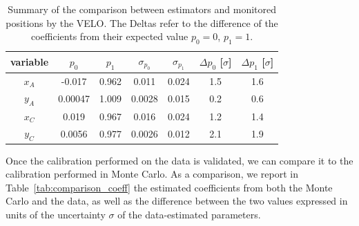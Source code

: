 \begin{table}
    \centering
    \begin{tabular}{c|c|c|c|c|c|c}
    variable  & $p_0$ & $p_1$ & $\sigma_{p_0}$ & $\sigma_{p_1}$ & $\Delta p_0$ [$\sigma$] & $\Delta p_1$ [$\sigma$]\\
    \hline
       $x_A$  & -0.017 & 0.962 & 0.011 & 0.024 & 1.5 & 1.6\\
       $y_A$  & 0.00047 & 1.009 & 0.0028 & 0.015 & 0.2 & 0.6 \\
       $x_C$ & 0.019 & 0.967 & 0.016 & 0.024 & 1.2 & 1.4\\
       $y_C$ & 0.0056 & 0.977 & 0.0026 & 0.012 & 2.1 & 1.9
    \end{tabular}
    \caption{Summary of the comparison between estimators and monitored positions by the VELO. The Deltas refer to the difference of the coefficients from their expected value $p_0=0$, $p_1=1$.}
    \label{tab:summary_velo}
\end{table}

Once the calibration performed on the data is validated, we can compare it to the calibration performed in Monte Carlo. As a comparison, we report in Table~\ref{tab:comparison_coeff} the estimated coefficients from both the Monte Carlo and the data, as well as the difference  between the two values expressed in units of the uncertainty $\sigma$ of the data-estimated parameters.


